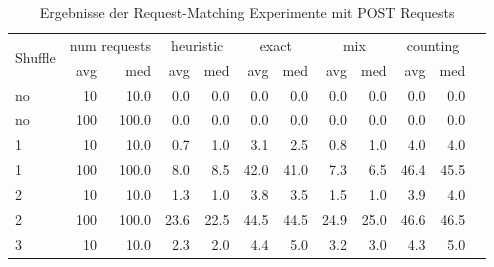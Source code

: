 \documentclass[12pt,a4paper]{report}
\begin{document}
\begin{table}[H]
	\centering
	\caption{Ergebnisse der Request-Matching Experimente mit POST Requests}
	\label{tab:post}
	\begin{tabular}{|l|r|r|r|r|r|r|r|r|r|r|r|}
		\hline
		\multirow{2}{*}{Shuffle} & \multicolumn{2}{|c|}{num requests} & \multicolumn{2}{|c|}{heuristic} & \multicolumn{2}{|c|}{exact} & \multicolumn{2}{|c|}{mix} & \multicolumn{2}{|c|}{counting}                                    \\ \cline{2-11}
		                         & avg                                & med                             & avg                         & med                       & avg                            & med  & avg  & med  & avg  & med  \\ \hline
		no                       & 10                                 & 10.0                            & 0.0                         & 0.0                       & 0.0                            & 0.0  & 0.0  & 0.0  & 0.0  & 0.0  \\ \hline
		no                       & 100                                & 100.0                           & 0.0                         & 0.0                       & 0.0                            & 0.0  & 0.0  & 0.0  & 0.0  & 0.0  \\ \hline
		1                        & 10                                 & 10.0                            & 0.7                         & 1.0                       & 3.1                            & 2.5  & 0.8  & 1.0  & 4.0  & 4.0  \\ \hline
		1                        & 100                                & 100.0                           & 8.0                         & 8.5                       & 42.0                           & 41.0 & 7.3  & 6.5  & 46.4 & 45.5 \\ \hline
		2                        & 10                                 & 10.0                            & 1.3                         & 1.0                       & 3.8                            & 3.5  & 1.5  & 1.0  & 3.9  & 4.0  \\ \hline
		2                        & 100                                & 100.0                           & 23.6                        & 22.5                      & 44.5                           & 44.5 & 24.9 & 25.0 & 46.6 & 46.5 \\ \hline
		3                        & 10                                 & 10.0                            & 2.3                         & 2.0                       & 4.4                            & 5.0  & 3.2  & 3.0  & 4.3  & 5.0  \\ \hline

\end{tabular}
\end{table}
\end{document}
